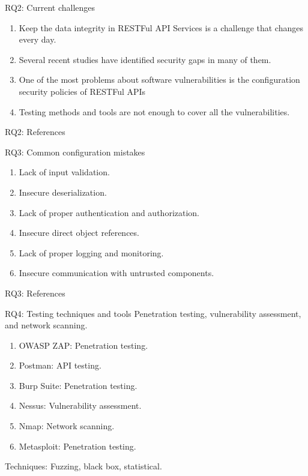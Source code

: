 \documentclass[10pt]{beamer}
\theoremstyle{remark}
\theoremstyle{definition}
\begin{document}
\begin{frame}{RQ2: Current challenges}
  \begin{enumerate}
    \item Keep the data integrity in RESTFul API Services is a challenge that changes every day.
    \item Several recent studies have identified security gaps in many of them.
    \item One of the most problems about software vulnerabilities is the configuration security policies of RESTFul APIs
    \item Testing methods and tools are not enough to cover all the vulnerabilities.
  \end{enumerate}
\end{frame}

\begin{frame}[allowframebreaks]{RQ2: References}
  \printbibliography[keyword={RQ2}]
  \end{frame}

  \begin{frame}{RQ3: Common configuration mistakes}
    \begin{enumerate}
      \item Lack of input validation.
      \item Insecure deserialization.
      \item Lack of proper authentication and authorization.
      \item Insecure direct object references.
      \item Lack of proper logging and monitoring.
        \item Insecure communication with untrusted components.
    \end{enumerate}
  \end{frame}

  \begin{frame}[allowframebreaks]{RQ3: References}
    \printbibliography[keyword={RQ3}]
  \end{frame}

  \begin{frame}{RQ4: Testing techniques and tools}
    Penetration testing, vulnerability assessment, and network scanning. 
    \begin{enumerate}
      \item OWASP ZAP: Penetration testing.
      \item Postman: API testing.
      \item Burp Suite: Penetration testing.
      \item Nessus: Vulnerability assessment.
      \item Nmap: Network scanning.
      \item Metasploit: Penetration testing.
    \end{enumerate}
    Techniques: Fuzzing, black box, statistical.
  \end{frame}
\end{document}
